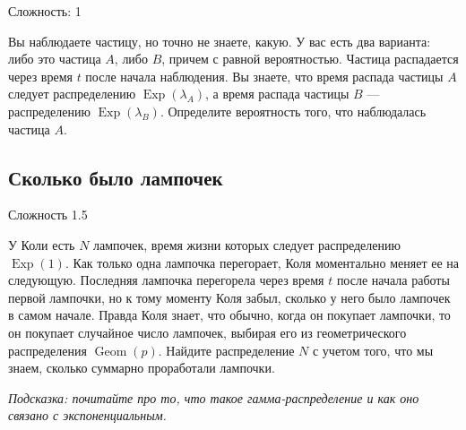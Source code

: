 \documentclass[12pt]{article}
\DeclareMathOperator{\Geom}{Geom}
\DeclareMathOperator{\Exp}{Exp}
\begin{document}
Сложность: 1

Вы наблюдаете частицу, но точно не знаете, какую. У вас есть два варианта: либо это частица $A$, либо $B$, причем с равной вероятностью. Частица распадается через время $t$ после начала наблюдения. Вы знаете, что время распада частицы $A$ следует распределению $\Exp(\lambda_A)$, а время распада частицы $B$ --- распределению $\Exp(\lambda_B)$. Определите вероятность того, что наблюдалась частица $A$.

\subsection{Сколько было лампочек}

Сложность 1.5

У Коли есть $N$ лампочек, время жизни которых следует распределению $\Exp(1)$. Как только одна лампочка перегорает, Коля моментально меняет ее на следующую. Последняя лампочка перегорела через время $t$ после начала работы первой лампочки, но к тому моменту Коля забыл, сколько у него было лампочек в самом начале. Правда Коля знает, что обычно, когда он покупает лампочки, то он покупает случайное число лампочек, выбирая его из геометрического распределения $\Geom(p)$. Найдите распределение $N$ с учетом того, что мы знаем, сколько суммарно проработали лампочки. 

\emph{Подсказка: почитайте про то, что такое гамма-распределение и как оно связано с экспоненциальным.}
\end{document}
